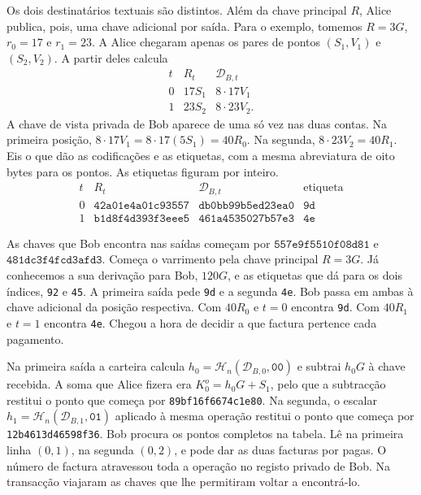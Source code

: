 Os dois destinatários textuais são distintos. Além da chave
principal \(R\), Alice publica, pois, uma chave adicional por
saída. Para o exemplo, tomemos \(R=3G\), \(r_0=17\) e \(r_1=23\).
A Alice chegaram apenas os pares de pontos \((S_1,V_1)\) e
\((S_2,V_2)\). A partir deles calcula
\[
\begin{array}{c|cc}
 t&R_t&\mathcal D_{B,t}\\ \hline
 0&17S_1&8\cdot17V_1\\
 1&23S_2&8\cdot23V_2 .
\end{array}
\]
A chave de vista privada de Bob aparece de uma só vez nas duas
contas. Na primeira posição, \(8\cdot17V_1=8\cdot17(5S_1)
=40R_0\). Na segunda, \(8\cdot23V_2=40R_1\). Eis o que dão as
codificações e as etiquetas, com a mesma abreviatura de oito bytes
para os pontos. As etiquetas figuram por inteiro.
\[
\begin{array}{c|lll}
 t & R_t & \mathcal D_{B,t} & \text{etiqueta}\\ \hline
 0 & \texttt{42a01e4a01c93557} & \texttt{db0bb99b5ed23ea0} & \texttt{9d}\\
 1 & \texttt{b1d8f4d393f3eee5} & \texttt{461a4535027b57e3} & \texttt{4e}
\end{array}
\]

As chaves que Bob encontra nas saídas começam por
\(\texttt{557e9f5510f08d81}\) e \(\texttt{481dc3f4fcd3afd3}\).
Começa o varrimento pela chave principal \(R=3G\). Já conhecemos
a sua derivação para Bob, \(120G\), e as etiquetas que dá para os
dois índices, \texttt{92} e \texttt{45}. A primeira saída pede
\texttt{9d} e a segunda \texttt{4e}. Bob passa em ambas à chave
adicional da posição respectiva. Com \(40R_0\) e \(t=0\) encontra
\texttt{9d}. Com \(40R_1\) e \(t=1\) encontra \texttt{4e}.
Chegou a hora de decidir a que factura pertence cada pagamento.

Na primeira saída a carteira calcula
\(h_0=\mathcal H_n(\mathcal D_{B,0},\texttt{00})\) e subtrai
\(h_0G\) à chave recebida. A soma que Alice fizera era
\(K_0^o=h_0G+S_1\), pelo que a subtracção restitui o ponto que
começa por \texttt{89bf16f6674c1e80}. Na segunda, o escalar
\(h_1=\mathcal H_n(\mathcal D_{B,1},\texttt{01})\) aplicado à
mesma operação restitui o ponto que começa por
\texttt{12b4613d46598f36}. Bob procura os pontos completos na
tabela. Lê na primeira linha \((0,1)\), na segunda \((0,2)\), e
pode dar as duas facturas por pagas. O número de factura atravessou
toda a operação no registo privado de Bob. Na transacção viajaram
as chaves que lhe permitiram voltar a encontrá-lo.

